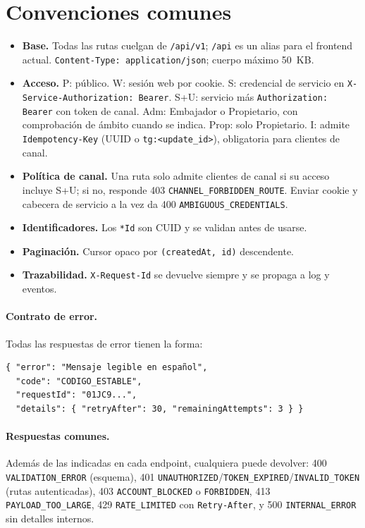 \documentclass[11pt,a4paper]{report}
\begin{document}
\section{Convenciones comunes}
\begin{itemize}[leftmargin=*,itemsep=1pt]
\item \textbf{Base.} Todas las rutas cuelgan de \texttt{/api/v1}; \texttt{/api} es un alias para el frontend actual. \texttt{Content-Type: application/json}; cuerpo máximo 50~KB.
\item \textbf{Acceso.} P: público. W: sesión web por cookie. S: credencial de servicio en \texttt{X-Service-Authorization: Bearer}. S+U: servicio más \texttt{Authorization: Bearer} con token de canal. Adm: Embajador o Propietario, con comprobación de ámbito cuando se indica. Prop: solo Propietario. I: admite \texttt{Idempotency-Key} (UUID o \texttt{tg:<update\_id>}), obligatoria para clientes de canal.
\item \textbf{Política de canal.} Una ruta solo admite clientes de canal si su acceso incluye S+U; si no, responde 403 \texttt{CHANNEL\_FORBIDDEN\_ROUTE}. Enviar cookie y cabecera de servicio a la vez da 400 \texttt{AMBIGUOUS\_CREDENTIALS}.
\item \textbf{Identificadores.} Los \texttt{*Id} son CUID y se validan antes de usarse.
\item \textbf{Paginación.} Cursor opaco por \texttt{(createdAt, id)} descendente.
\item \textbf{Trazabilidad.} \texttt{X-Request-Id} se devuelve siempre y se propaga a log y eventos.
\end{itemize}

\paragraph{Contrato de error.} Todas las respuestas de error tienen la forma:
\begin{lstlisting}[language={},basicstyle=\ttfamily\small]
{ "error": "Mensaje legible en español",
  "code": "CODIGO_ESTABLE",
  "requestId": "01JC9...",
  "details": { "retryAfter": 30, "remainingAttempts": 3 } }
\end{lstlisting}
\paragraph{Respuestas comunes.} Además de las indicadas en cada endpoint, cualquiera puede devolver: 400 \texttt{VALIDATION\_ERROR} (esquema), 401 \texttt{UNAUTHORIZED}/\texttt{TOKEN\_EXPIRED}/\texttt{INVALID\_TOKEN} (rutas autenticadas), 403 \texttt{ACCOUNT\_BLOCKED} o \texttt{FORBIDDEN}, 413 \texttt{PAYLOAD\_TOO\_LARGE}, 429 \texttt{RATE\_LIMITED} con \texttt{Retry-After}, y 500 \texttt{INTERNAL\_ERROR} sin detalles internos.
\end{document}
